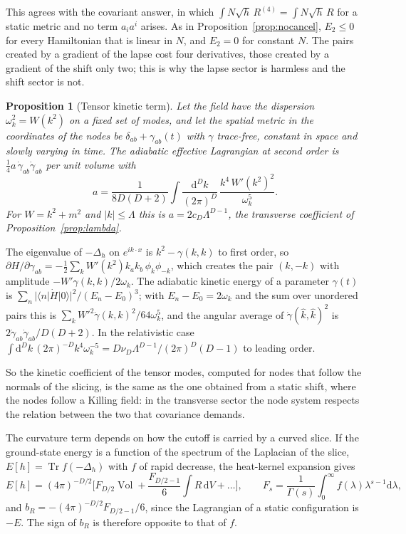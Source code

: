 \documentclass[11pt,a4paper]{article}
\makeatletter
\theoremstyle{stmt}
\newtheorem{proposition}[theorem]{Proposition}
\theoremstyle{defn}
\theoremstyle{rmk}
\renewenvironment{proof}[1][\proofname]{\par\pushQED{\qed}\normalfont\topsep6\p@\@plus6\p@\relax
  \trivlist\item[\hskip\labelsep{\sffamily\itshape\small #1.}]\ignorespaces}{\popQED\endtrivlist\@endpefalse}
\numberwithin{equation}{section}
\DeclareMathOperator{\Tr}{Tr}
\DeclareMathOperator{\Vol}{Vol}
\newcommand{\dd}{\mathrm{d}}
\makeatother
\begin{document}
This agrees with the covariant answer, in which $\int N\sqrt h\,R^{(4)}=\int N\sqrt h\,R$ for a static metric and no term $a_ia^i$ arises. As in Proposition~\ref{prop:nocancel}, $E_2\le0$ for every Hamiltonian that is linear in $N$, and $E_2=0$ for constant $N$. The pairs created by a gradient of the lapse cost four derivatives, those created by a gradient of the shift only two; this is why the lapse sector is harmless and the shift sector is not.

\begin{proposition}[Tensor kinetic term]\label{prop:tensorkin}
Let the field have the dispersion $\omega_k^2=W(k^2)$ on a fixed set of modes, and let the spatial metric in the coordinates of the nodes be $\delta_{ab}+\gamma_{ab}(t)$ with $\gamma$ trace-free, constant in space and slowly varying in time. The adiabatic effective Lagrangian at second order is $\tfrac14a\,\dot\gamma_{ab}\dot\gamma_{ab}$ per unit volume with
\begin{equation}\label{eq:aT}
a=\frac{1}{8D(D+2)}\int\frac{\dd^Dk}{(2\pi)^D}\,\frac{k^4\,W'(k^2)^2}{\omega_k^5}.
\end{equation}
For $W=k^2+m^2$ and $|k|\le\Lambda$ this is $a=2c_D\Lambda^{D-1}$, the transverse coefficient of Proposition~\ref{prop:lambda}.
\end{proposition}

\begin{proof}
The eigenvalue of $-\Delta_h$ on $e^{ik\cdot x}$ is $k^2-\gamma(k,k)$ to first order, so $\partial H/\partial\gamma_{ab}=-\tfrac12\sum_kW'(k^2)k_ak_b\,\phi_k\phi_{-k}$, which creates the pair $(k,-k)$ with amplitude $-W'\gamma(k,k)/2\omega_k$. The adiabatic kinetic energy of a parameter $\gamma(t)$ is $\sum_n|\langle n|\dot H|0\rangle|^2/(E_n-E_0)^3$; with $E_n-E_0=2\omega_k$ and the sum over unordered pairs this is $\sum_kW'^2\dot\gamma(k,k)^2/64\omega_k^5$, and the angular average of $\dot\gamma(\hat k,\hat k)^2$ is $2\dot\gamma_{ab}\dot\gamma_{ab}/D(D+2)$. In the relativistic case $\int\dd^Dk\,(2\pi)^{-D}k^4\omega_k^{-5}=D\nu_D\Lambda^{D-1}/(2\pi)^D(D-1)$ to leading order.
\end{proof}

So the kinetic coefficient of the tensor modes, computed for nodes that follow the normals of the slicing, is the same as the one obtained from a static shift, where the nodes follow a Killing field: in the transverse sector the node system respects the relation between the two that covariance demands.

The curvature term depends on how the cutoff is carried by a curved slice. If the ground-state energy is a function of the spectrum of the Laplacian of the slice, $E[h]=\Tr f(-\Delta_h)$ with $f$ of rapid decrease, the heat-kernel expansion gives
\begin{equation}\label{eq:specfun}
E[h]=(4\pi)^{-D/2}\Big[F_{D/2}\Vol+\frac{F_{D/2-1}}{6}\int R\,\dd V+\dots\Big],\qquad F_s=\frac1{\Gamma(s)}\int_0^\infty f(\lambda)\lambda^{s-1}\dd\lambda ,
\end{equation}
and $b_R=-(4\pi)^{-D/2}F_{D/2-1}/6$, since the Lagrangian of a static configuration is $-E$. The sign of $b_R$ is therefore opposite to that of $f$.
\end{document}
